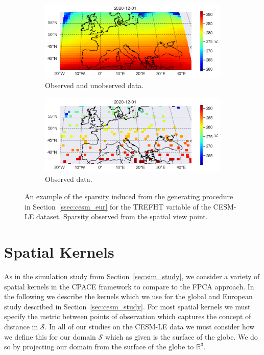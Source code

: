 \begin{figure}
	\centering
	\begin{subfigure}[b]{0.45\textwidth}
		\includegraphics[width=\textwidth]{eur_sparse_full}
		\caption{Observed and unobserved data.}
	\end{subfigure}
	\hfill        
	\begin{subfigure}[b]{0.45\textwidth}
		\includegraphics[width=\textwidth]{eur_sparse_train}
		\caption{Observed data.}
	\end{subfigure}
	\caption{An example of the sparsity induced from the  generating procedure in Section~\ref{ssec:cesm_eur} for the TREFHT variable of the CESM-LE dataset. Sparsity observed from the spatial view point.}
	\label{fig:cesm_sparsity_eur}
\end{figure}


\section{Spatial Kernels \label{sec:cesm_kernels}}
As in the simulation study from Section~\ref{sec:sim_study}, we consider a variety of spatial kernels in the CPACE framework to compare to the FPCA approach.
In the following we describe the kernels which we use for the global and European study described in Section~\ref{sec:cesm_study}.
For most spatial kernels we must specify the metric between points of observation which captures the concept of distance in $\mathcal{S}$.
In all of our studies on the CESM-LE data we must consider how we define this for our domain $\mathcal{S}$ which as given is the surface of the globe.
We do so by projecting our domain from the surface of the globe to $\mathbb{R}^{3}$. 

